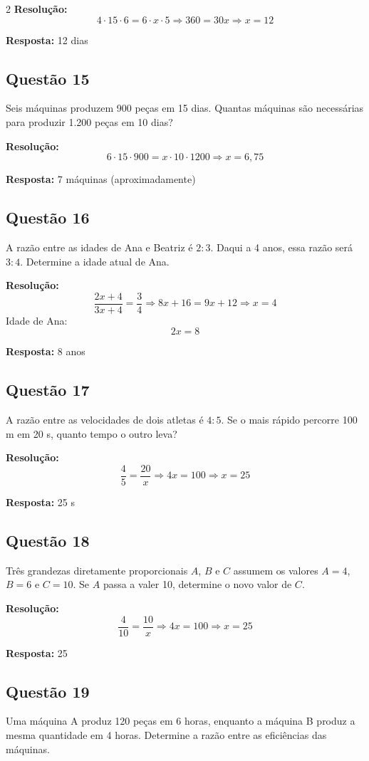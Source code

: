 \documentclass[11pt]{article}
\begin{document}
\begin{multicols}{2}
\textbf{Resolução:}
\[
4 \cdot 15 \cdot 6 = 6 \cdot x \cdot 5
\Rightarrow 360 = 30x
\Rightarrow x = 12
\]

\textbf{Resposta:} 12 dias

\subsection*{Questão 15}
Seis máquinas produzem 900 peças em 15 dias. Quantas máquinas são necessárias para produzir 1.200 peças em 10 dias?

\textbf{Resolução:}
\[
6 \cdot 15 \cdot 900 = x \cdot 10 \cdot 1200
\Rightarrow x = 6{,}75
\]

\textbf{Resposta:} 7 máquinas (aproximadamente)

\subsection*{Questão 16}
A razão entre as idades de Ana e Beatriz é $2:3$. Daqui a 4 anos, essa razão será $3:4$. Determine a idade atual de Ana.

\textbf{Resolução:}
\[
\frac{2x + 4}{3x + 4} = \frac{3}{4}
\Rightarrow 8x + 16 = 9x + 12
\Rightarrow x = 4
\]
Idade de Ana:
\[
2x = 8
\]

\textbf{Resposta:} 8 anos

\subsection*{Questão 17}
A razão entre as velocidades de dois atletas é $4:5$. Se o mais rápido percorre 100 m em 20 s, quanto tempo o outro leva?

\textbf{Resolução:}
\[
\frac{4}{5} = \frac{20}{x}
\Rightarrow 4x = 100
\Rightarrow x = 25
\]

\textbf{Resposta:} 25 s

\subsection*{Questão 18}
Três grandezas diretamente proporcionais $A$, $B$ e $C$ assumem os valores $A=4$, $B=6$ e $C=10$. Se $A$ passa a valer 10, determine o novo valor de $C$.

\textbf{Resolução:}
\[
\frac{4}{10} = \frac{10}{x}
\Rightarrow 4x = 100
\Rightarrow x = 25
\]

\textbf{Resposta:} 25

\subsection*{Questão 19}
Uma máquina A produz 120 peças em 6 horas, enquanto a máquina B produz a mesma quantidade em 4 horas. Determine a razão entre as eficiências das máquinas.


\end{multicols}
\end{document}
